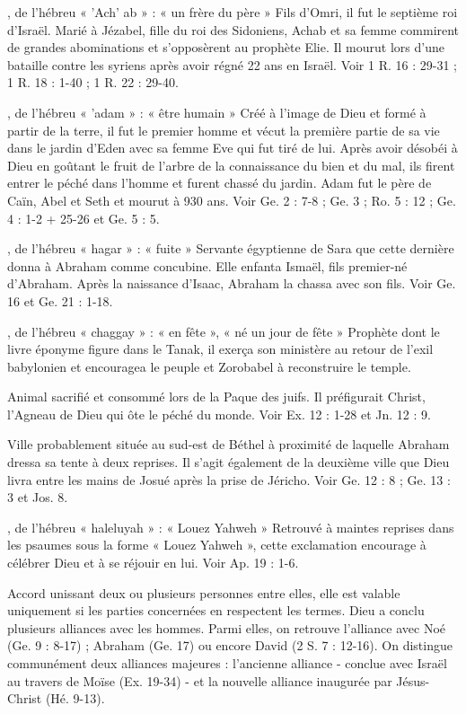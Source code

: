 \begin{multicols}{2}
, de l'hébreu « 'Ach' ab » : « un frère du père »
Fils d'Omri, il fut le septième roi d'Israël. Marié à Jézabel, fille du roi des Sidoniens, Achab et sa femme commirent de grandes abominations et s’opposèrent au prophète Elie. Il mourut lors d'une bataille contre les syriens après avoir régné 22 ans en Israël. Voir 1 R. 16 : 29-31 ; 1 R. 18 : 1-40 ; 1 R. 22 : 29-40.

, de l'hébreu « 'adam » : « être humain »
Créé à l’image de Dieu et formé à partir de la terre, il fut le premier homme et vécut la première partie de sa vie dans le jardin d’Eden avec sa femme Eve qui fut tiré de lui. Après avoir désobéi à Dieu en goûtant le fruit de l'arbre de la connaissance du bien et du mal, ils firent entrer le péché dans l’homme et furent chassé du jardin. Adam fut le père de Caïn, Abel et Seth et mourut à 930 ans. Voir Ge. 2 : 7-8 ; Ge. 3 ; Ro. 5 : 12 ; Ge. 4 : 1-2 + 25-26 et Ge. 5 : 5.

, de l'hébreu « hagar » : « fuite »
Servante égyptienne de Sara que cette dernière donna à Abraham comme concubine. Elle enfanta Ismaël, fils premier-né d’Abraham. Après la naissance d’Isaac, Abraham la chassa avec son fils. Voir Ge. 16 et Ge. 21 : 1-18.

, de l'hébreu « chaggay » : « en fête », « né un jour de fête »
Prophète dont le livre éponyme figure dans le Tanak, il exerça son ministère au retour de l'exil babylonien et encouragea le peuple et Zorobabel à reconstruire le temple.

Animal sacrifié et consommé lors de la Paque des juifs. Il préfigurait Christ, l'Agneau de Dieu qui ôte le péché du monde. Voir Ex. 12 : 1-28 et Jn. 12 : 9.

Ville probablement située au sud-est de Béthel à proximité de laquelle Abraham dressa sa tente à deux reprises. Il s’agit également de la deuxième ville que Dieu livra entre les mains de Josué après la prise de Jéricho. Voir Ge. 12 : 8 ; Ge. 13 : 3 et Jos. 8.

, de l’hébreu « haleluyah » : « Louez Yahweh »
Retrouvé à maintes reprises dans les psaumes sous la forme « Louez Yahweh », cette exclamation encourage à célébrer Dieu et à se réjouir en lui. Voir Ap. 19 : 1-6.

Accord unissant deux ou plusieurs personnes entre elles, elle est valable uniquement si les parties concernées en respectent les termes. Dieu a conclu plusieurs alliances avec les hommes. Parmi elles, on retrouve l’alliance avec Noé (Ge. 9 : 8-17) ; Abraham (Ge. 17) ou encore David (2 S. 7 : 12-16). On distingue communément deux alliances majeures : l’ancienne alliance - conclue avec Israël au travers de Moïse (Ex. 19-34) - et la nouvelle alliance inaugurée par Jésus-Christ (Hé. 9-13).


\end{multicols}

